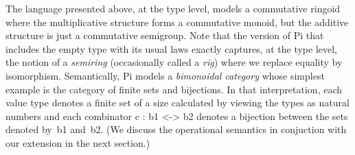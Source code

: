 \documentclass[preprint]{sigplanconf}
\newcommand{\jacques}[1]{\textsc{Jacques says:} #1}
\newtheorem{definition}{Definition}
\begin{document}


The language presented above, at the type level, models a commutative ringoid
where the multiplicative structure forms a commutative monoid, but the
additive structure is just a commutative semigroup.  Note that the version of
{{Pi}} that includes the empty type with its usual laws exactly captures, at
the type level, the notion of a \emph{semiring} (occasionally called a
\emph{rig}) where we replace equality by isomorphism.  Semantically, {{Pi}}
models a \emph{bimonoidal category} whose simplest example is the category of
finite sets and bijections. In that interpretation, each value type denotes a
finite set of a size calculated by viewing the types as natural numbers and
each combinator {{c : b1 <-> b2}} denotes a bijection between the sets
denoted by~{{b1}} and~{{b2}}. (We discuss the operational semantics in
conjuction with our extension in the next section.) 


\end{document}

